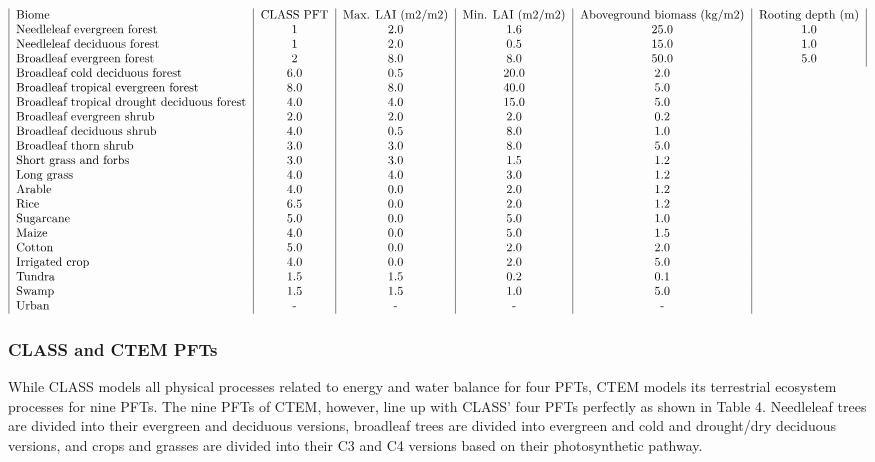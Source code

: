 \[ \begin{tabular}{ | l | c | c | c | c | c | c | c | c | } Biome & CLASS PFT & Max. LAI (m2/m2) & Min. LAI (m2/m2) & Aboveground biomass (kg/m2) & Rooting depth (m) \\ Needleleaf evergreen forest & 1 & 2.0 & 1.6 & 25.0 & 1.0 \\ Needleleaf deciduous forest & 1 & 2.0 & 0.5 & 15.0 & 1.0 \\ Broadleaf evergreen forest & 2 & 8.0 & 8.0 & 50.0 & 5.0 \\ Broadleaf cold deciduous forest & 6.0 & 0.5 & 20.0 & 2.0 \\ Broadleaf tropical evergreen forest & 8.0 & 8.0 & 40.0 & 5.0 \\ Broadleaf tropical drought deciduous forest & 4.0 & 4.0 & 15.0 & 5.0 \\ Broadleaf evergreen shrub & 2.0 & 2.0 & 2.0 & 0.2 \\ Broadleaf deciduous shrub & 4.0 & 0.5 & 8.0 & 1.0 \\ Broadleaf thorn shrub & 3.0 & 3.0 & 8.0 & 5.0 \\ Short grass and forbs & 3.0 & 3.0 & 1.5 & 1.2 \\ Long grass & 4.0 & 4.0 & 3.0 & 1.2 \\ Arable & 4.0 & 0.0 & 2.0 & 1.2 \\ Rice & 6.5 & 0.0 & 2.0 & 1.2 \\ Sugarcane & 5.0 & 0.0 & 5.0 & 1.0 \\ Maize & 4.0 & 0.0 & 5.0 & 1.5 \\ Cotton & 5.0 & 0.0 & 2.0 & 2.0 \\ Irrigated crop & 4.0 & 0.0 & 2.0 & 5.0 \\ Tundra & 1.5 & 1.5 & 0.2 & 0.1 \\ Swamp & 1.5 & 1.5 & 1.0 & 5.0 \\ Urban & - & - & - & - \\ \end{tabular} \] \hypertarget{index_classtoctem}{}\subsubsection{C\+L\+A\+S\+S and C\+T\+E\+M P\+F\+Ts}\label{index_classtoctem}
While C\+L\+A\+S\+S models all physical processes related to energy and water balance for four P\+F\+Ts, C\+T\+E\+M models its terrestrial ecosystem processes for nine P\+F\+Ts. The nine P\+F\+Ts of C\+T\+E\+M, however, line up with C\+L\+A\+S\+S’ four P\+F\+Ts perfectly as shown in Table 4. Needleleaf trees are divided into their evergreen and deciduous versions, broadleaf trees are divided into evergreen and cold and drought/dry deciduous versions, and crops and grasses are divided into their C3 and C4 versions based on their photosynthetic pathway.

